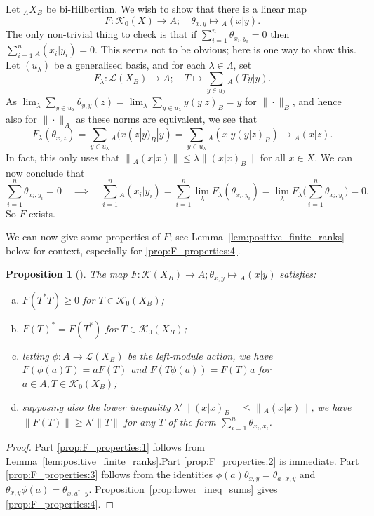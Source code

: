 \documentclass[a4paper,11pt]{article}
\theoremstyle{plain}
\newtheorem{proposition}{Proposition}[section]
\theoremstyle{remark}
\newcommand{\mc}[1]{\mathcal{#1}}
\begin{document}
Let ${}_A X_B$ be bi-Hilbertian.  We wish to show that there is a linear map
\[ F \colon \mc K_0(X) \to A; \quad \theta_{x,y} \mapsto {}_A(x|y). \]
The only non-trivial thing to check is that if $\sum_{i=1}^n \theta_{x_i, y_i} = 0$ then $\sum_{i=1}^n {}_A (x_i|y_i)=0$.  This seems not to be obvious; here is one way to show this.  Let $(u_\lambda)$ be a generalised basis, and for each $\lambda\in\Lambda$, set
\[ F_\lambda \colon \mc L(X_B) \to A; \quad T \mapsto \sum_{y\in u_\lambda} {}_A (Ty|y). \]
As $\lim_\lambda \sum_{y\in u_\lambda} \theta_{y,y}(z) = \lim_\lambda \sum_{y\in u_\lambda} y (y|z)_B = y$ for $\|\cdot\|_B$, and hence also for $\|\cdot\|_A$ as these norms are equivalent, we see that
\[ F_\lambda(\theta_{x,z}) = \sum_{y\in u_\lambda} {}_A (x (z|y)_B|y)
= \sum_{y\in u_\lambda} {}_A(x|y(y|z)_B) \to {}_A(x|z). \]
In fact, this only uses that $\|{}_A(x|x)\| \leq \lambda \|(x|x)_B\|$ for all $x\in X$.  We can now conclude that
\[ \sum_{i=1}^n \theta_{x_i, y_i} = 0
\quad\implies\quad
\sum_{i=1}^n {}_A(x_i|y_i) = \sum_{i=1}^n \lim_\lambda F_\lambda(\theta_{x_i,y_i})
= \lim_\lambda F_\lambda\Big( \sum_{i=1}^n \theta_{x_i,y_i} \Big) = 0. \]
So $F$ exists.

We can now give some properties of $F$; see Lemma~\ref{lem:positive_finite_ranks} below for context, especially for \ref{prop:F_properties:4}.

\begin{proposition}[{\cite[Lemma~2.6]{KPW_JonesIndexTheory}}]\label{prop:F_properties}
The map $F \colon \mc K(X_B) \to A; \theta_{x,y} \mapsto {}_A(x|y)$ satisfies:
\begin{enumerate}[(a)]
  \item\label{prop:F_properties:1}
  $F(T^*T) \geq 0$ for $T\in\mc K_0(X_B)$;
  \item\label{prop:F_properties:2}
  $F(T)^* = F(T^*)$ for $T\in\mc K_0(X_B)$;
  \item\label{prop:F_properties:3}
  letting $\phi\colon A \to \mc L(X_B)$ be the left-module action, we have $F(\phi(a)T) = a F(T)$ and $F(T\phi(a)) = F(T)a$ for $a\in A, T\in\mc K_0(X_B)$;
  \item\label{prop:F_properties:4}
  supposing also the lower inequality $\lambda' \|(x|x)_B\| \leq \|{}_A(x|x)\|$, we have $\|F(T)\| \geq \lambda' \|T\|$ for any $T$ of the form $\sum_{i=1}^n \theta_{x_i,x_i}$.
\end{enumerate}
\end{proposition}
\begin{proof}
Part \ref{prop:F_properties:1} follows from Lemma~\ref{lem:positive_finite_ranks}.Part \ref{prop:F_properties:2} is immediate.  Part \ref{prop:F_properties:3} follows from the identities $\phi(a) \theta_{x,y} = \theta_{a\cdot x, y}$ and $\theta_{x,y} \phi(a) = \theta_{x, a^*\cdot y}$.  Proposition~\ref{prop:lower_ineq_sums} gives \ref{prop:F_properties:4}.
\end{proof}
\end{document}
